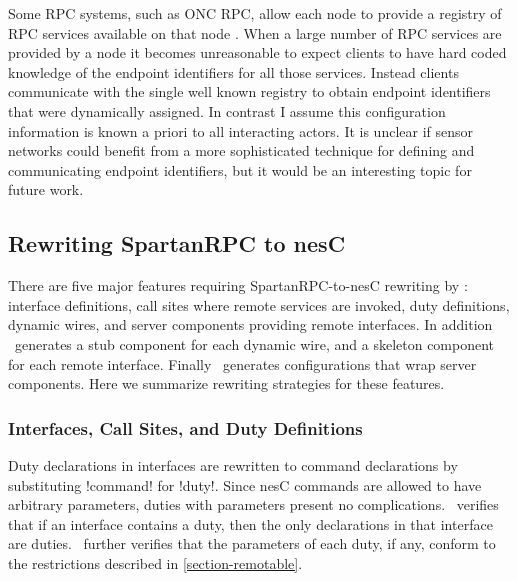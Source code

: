 Some RPC systems, such as ONC RPC, allow each node to provide a registry of RPC services
available on that node \cite{RFC-1833}. When a large number of RPC services are provided by a
node it becomes unreasonable to expect clients to have hard coded knowledge of the endpoint
identifiers for all those services. Instead clients communicate with the single well known
registry to obtain endpoint identifiers that were dynamically assigned. In contrast I assume
this configuration information is known a priori to all interacting actors. It is unclear if
sensor networks could benefit from a more sophisticated technique for defining and communicating
endpoint identifiers, but it would be an interesting topic for future work.

\subsection{Rewriting SpartanRPC to nesC}

There are five major features requiring SpartanRPC-to-nesC rewriting by \Sprocket: interface
definitions, call sites where remote services are invoked, duty definitions, dynamic wires, and
server components providing remote interfaces. In addition \Sprocket\ generates a stub component
for each dynamic wire, and a skeleton component for each remote interface. Finally \Sprocket\
generates configurations that wrap server components. Here we summarize rewriting strategies for
these features.


\subsubsection{Interfaces, Call Sites, and Duty Definitions}

Duty declarations in interfaces are rewritten to command declarations by substituting !command!
for !duty!. Since nesC commands are allowed to have arbitrary parameters, duties with parameters
present no complications. \Sprocket\ verifies that if an interface contains a duty, then the
only declarations in that interface are duties. \Sprocket\ further verifies that the parameters
of each duty, if any, conform to the restrictions described in \autoref{section-remotable}.

